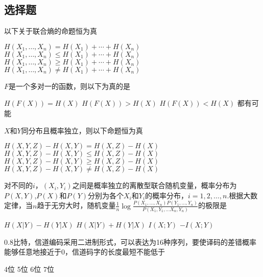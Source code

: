 \documentclass{exam}
\newif\ifprint
\newcommand{\blank}[2][1cm]{\uline{\makebox[#1][c]{%
  \ifprint
    \phantom{#2}%
  \else
    #2%
  \fi}}}
\begin{document}
\begin{CJK*}{UTF8}{gbsn}
\section*{选择题}
    \begin{questions}
    \question 以下关于联合熵的命题\blank{C}恒为真
    \begin{choices}
        \choice $H({X_1}, \ldots ,{X_n}) = H({X_1}) +  \cdots  + H({X_n})$
        \choice $H({X_1}, \ldots ,{X_n}) \le H({X_1}) +  \cdots  + H({X_n})$
        \choice $H({X_1}, \ldots ,{X_n}) \ge H({X_1}) +  \cdots  + H({X_n})$
        \choice $H({X_1}, \ldots ,{X_n}) \ne H({X_1}) +  \cdots  + H({X_n})$\\
    \end{choices}
    
    \question $F$是一个多对一的函数，则以下为真的是\blank{C}
    \begin{choices}
        \choice $H(F(X)) = H(X)$
        \choice $H(F(X)) > H(X)$
        \choice $H(F(X)) < H(X)$
        \choice 都有可能\\
    \end{choices}
    
    \question $X$和$Y$同分布且概率独立，则以下命题\blank{B}恒为真
    \begin{choices}
        \choice $H(X,Y,Z) - H(X,Y) = H(X,Z) - H(X)$
        \choice $H(X,Y,Z) - H(X,Y) \le H(X,Z) - H(X)$
        \choice $H(X,Y,Z) - H(X,Y) \ge H(X,Z) - H(X)$
        \choice $H(X,Y,Z) - H(X,Y) \ne H(X,Z) - H(X)$\\
    \end{choices}
    
    \question 对不同的$i$，$\left( {{X_i},{Y_i}} \right)$之间是概率独立的离散型联合随机变量，概率分布为$P(X,Y)$,$P(X)$和$P(Y)$分别为各个$X_i$和$Y_i$的概率分布，$i = 1,2, \ldots ,n$.根据大数定律，当$n$趋于无穷大时，随机变量$\frac{1}{n}\log \frac{{P\left( {{X_1}, \ldots ,{X_n}} \right)P\left( {{Y_1}, \ldots ,{Y_n}} \right)}}{{P({X_1},{Y_1}, \ldots {X_n},{Y_n})}}$的极限是\blank{C}
    \begin{choices}
        \choice $H(X|Y) - H(Y|X)$
        \choice $H(X|Y) + H(Y|X)$
        \choice $I(X;Y)$
        \choice $-I(X;Y)$\\
    \end{choices}
    
    0.8比特，信道编码采用二进制形式，可以表达为16种序列，要使译码的差错概率能够任意地接近于0，信道码字的长度最短不能低于\blank{B}
    \begin{choices}
        \choice 4位
        \choice 5位
        \choice 6位
        \choice 7位
    \end{choices}
\end{questions}


\end{CJK*}
\end{document}
